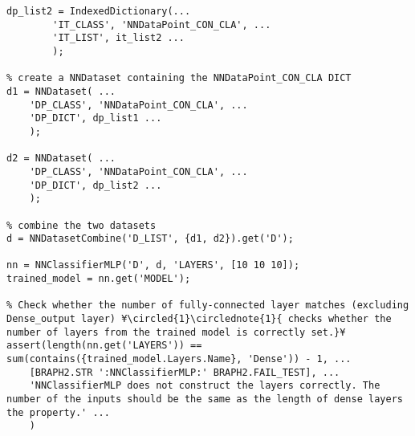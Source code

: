 \documentclass{tufte-handout}
\begin{document}
\begin{lstlisting}
dp_list2 = IndexedDictionary(...
        'IT_CLASS', 'NNDataPoint_CON_CLA', ...
        'IT_LIST', it_list2 ...
        );

% create a NNDataset containing the NNDataPoint_CON_CLA DICT
d1 = NNDataset( ...
    'DP_CLASS', 'NNDataPoint_CON_CLA', ...
    'DP_DICT', dp_list1 ...
    );

d2 = NNDataset( ...
    'DP_CLASS', 'NNDataPoint_CON_CLA', ...
    'DP_DICT', dp_list2 ...
    );

% combine the two datasets
d = NNDatasetCombine('D_LIST', {d1, d2}).get('D');

nn = NNClassifierMLP('D', d, 'LAYERS', [10 10 10]);
trained_model = nn.get('MODEL');

% Check whether the number of fully-connected layer matches (excluding Dense_output layer) ¥\circled{1}\circlednote{1}{ checks whether the number of layers from the trained model is correctly set.}¥
assert(length(nn.get('LAYERS')) == sum(contains({trained_model.Layers.Name}, 'Dense')) - 1, ...
    [BRAPH2.STR ':NNClassifierMLP:' BRAPH2.FAIL_TEST], ...
    'NNClassifierMLP does not construct the layers correctly. The number of the inputs should be the same as the length of dense layers the property.' ...
    )

\end{lstlisting}

%
%
\end{document}
